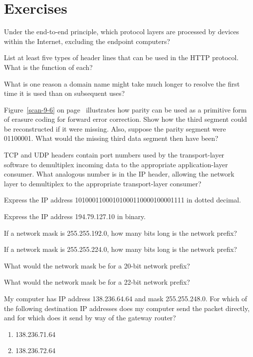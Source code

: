 \section*{Exercises}

\begin{chapterEnumerate}
\item
Under the end-to-end principle, which protocol layers are processed by
devices within the Internet, excluding the endpoint computers?
\item
List at least five types of header lines that can be used in the HTTP
protocol.  What is the function of each?
\item
What is one reason a domain name might take much longer to resolve the first time it
is used than on subsequent uses?
\item
Figure~\ref{scan-9-6} on page~\pageref{scan-9-6} illustrates how parity can be used as a
primitive form of erasure coding for forward error correction.  Show
how the third segment could be reconstructed if it were missing.
Also, suppose the parity segment were 01100001.  What would the
missing third data segment then have been?
\item
TCP and UDP headers contain port numbers used by the transport-layer
software to demultiplex incoming data to the appropriate
application-layer consumer.  What analogous number is in the IP header,
allowing the network layer to demultiplex to the appropriate
transport-layer consumer?
\item
Express the IP address 10100011000101000110000100001111 in dotted
decimal.
\item
Express the IP address 194.79.127.10 in binary.
\item
If a network mask is 255.255.192.0, how many bits long is the network prefix?
\item
If a network mask is 255.255.224.0, how many bits long is the network prefix?
\item
What would the network mask be for a 20-bit network prefix?
\item
What would the network mask be for a 22-bit network prefix?
\item
My computer has IP address 138.236.64.64 and mask 255.255.248.0.  For
which of the following destination IP addresses does my computer send the packet
directly, and for which does it send by way of the gateway router?
\begin{enumerate}
\item
138.236.71.64
\item
138.236.72.64

\end{enumerate}
\end{chapterEnumerate}

